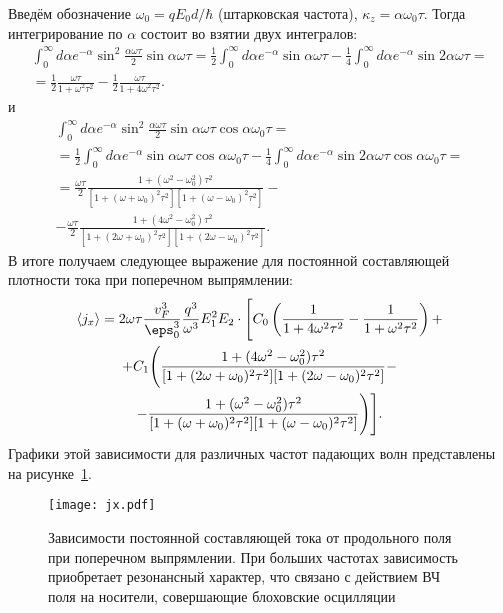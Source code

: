 Введём обозначение \( \omega_0 = qE_0d/\hbar \) (штарковская частота), \( \kappa_z = \alpha\omega_0\tau\).
Тогда интегрирование по \( \alpha \) состоит во взятии двух интегралов:
\begin{gather*}
    \int_0^\infty d\alpha e^{-\alpha}
    \sin^2\frac{\alpha\omega\tau}{2}\sin\alpha\omega\tau
    =\frac{1}{2}\int_0^\infty d\alpha e^{-\alpha} \sin\alpha\omega\tau
    -\frac{1}{4}\int_0^\infty d\alpha e^{-\alpha} \sin2\alpha\omega\tau =\\=
    \frac{1}{2}\frac{\omega\tau}{1+\omega^2\tau^2} -
    \frac{1}{2}\frac{\omega\tau}{1+4\omega^2\tau^2}.
\end{gather*}
и
\begin{gather*}
    \int_0^\infty d\alpha e^{-\alpha}\sin^2\frac{\alpha\omega\tau}{2}
    \sin\alpha\omega\tau\cos\alpha\omega_0\tau=\\=
    \frac{1}{2}\int_0^\infty d\alpha e^{-\alpha} \sin\alpha\omega\tau
    \cos\alpha\omega_0\tau
    -\frac{1}{4}\int_0^\infty d\alpha e^{-\alpha} \sin2\alpha\omega\tau
    \cos\alpha\omega_0\tau = \\ =
    \frac{\omega\tau}{2}\frac{1+(\omega^2-\omega_0^2)\tau^2}
    {[1+(\omega+\omega_0)^2\tau^2][1+(\omega-\omega_0)^2\tau^2]}-\\-
    \frac{\omega\tau}{2}\frac{1+(4\omega^2-\omega_0^2)\tau^2}
    {[1+(2\omega+\omega_0)^2\tau^2][1+(2\omega-\omega_0)^2\tau^2]}.
\end{gather*}
В итоге получаем следующее выражение для постоянной составляющей плотности тока при поперечном выпрямлении:
\begin{gather*}
    \langle j_x \rangle = 2\omega\tau
    \frac{v_F^3}{\eps_0^3}\frac{q^3}{\omega^3}E_1^2 E_2
    \cdot\Bigg[
        C_0\left(
            \frac{1}{1+4\omega^2\tau^2} -
            \frac{1}{1+\omega^2\tau^2}
            \right) +\\+
        C_1\Bigg(
            \frac{1+(4\omega^2-\omega_0^2)\tau^2}
            {[1+(2\omega+\omega_0)^2\tau^2][1+(2\omega-\omega_0)^2\tau^2]}-\\-
            \frac{1+(\omega^2-\omega_0^2)\tau^2}
            {[1+(\omega+\omega_0)^2\tau^2][1+(\omega-\omega_0)^2\tau^2]}
            \Bigg)
    \Bigg].
\end{gather*}
Графики этой зависимости для различных частот падающих волн представлены на рисунке~\ref{fig:jx}.
\begin{figure}[ht]
\begin{center}
    \texttt{[image: jx.pdf]}
    \caption{Зависимости постоянной составляющей тока от продольного поля при поперечном выпрямлении. При больших частотах зависимость приобретает резонансный характер, что связано с действием ВЧ поля на носители, совершающие блоховские осцилляции}
    \label{fig:jx}
\end{center}
\end{figure}
